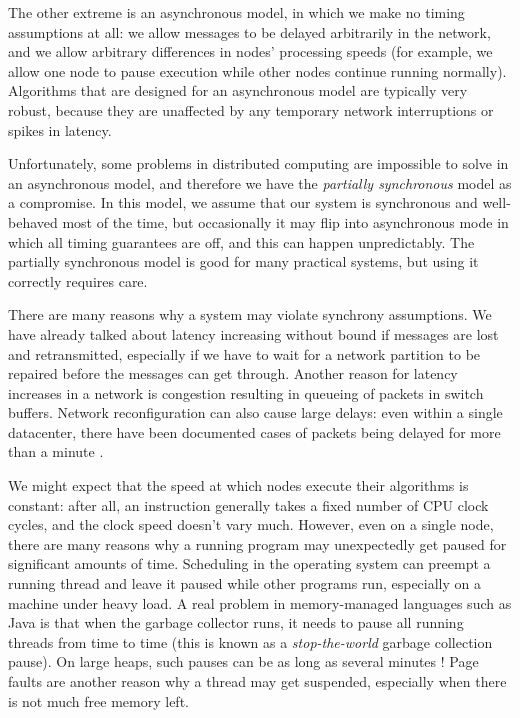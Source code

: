 The other extreme is an asynchronous model, in which we make no timing assumptions at all: we allow messages to be delayed arbitrarily in the network, and we allow arbitrary differences in nodes' processing speeds (for example, we allow one node to pause execution while other nodes continue running normally).
Algorithms that are designed for an asynchronous model are typically very robust, because they are unaffected by any temporary network interruptions or spikes in latency.

Unfortunately, some problems in distributed computing are impossible to solve in an asynchronous model, and therefore we have the \emph{partially synchronous} model as a compromise.
In this model, we assume that our system is synchronous and well-behaved most of the time, but occasionally it may flip into asynchronous mode in which all timing guarantees are off, and this can happen unpredictably.
The partially synchronous model is good for many practical systems, but using it correctly requires care.

There are many reasons why a system may violate synchrony assumptions.
We have already talked about latency increasing without bound if messages are lost and retransmitted, especially if we have to wait for a network partition to be repaired before the messages can get through.
Another reason for latency increases in a network is congestion resulting in queueing of packets in switch buffers.
Network reconfiguration can also cause large delays: even within a single datacenter, there have been documented cases of packets being delayed for more than a minute \citep{Imbriaco:2012tx}.

We might expect that the speed at which nodes execute their algorithms is constant: after all, an instruction generally takes a fixed number of CPU clock cycles, and the clock speed doesn't vary much.
However, even on a single node, there are many reasons why a running program may unexpectedly get paused for significant amounts of time.
Scheduling in the operating system can preempt a running thread and leave it paused while other programs run, especially on a machine under heavy load.
A real problem in memory-managed languages such as Java is that when the garbage collector runs, it needs to pause all running threads from time to time (this is known as a \emph{stop-the-world} garbage collection pause).
On large heaps, such pauses can be as long as several minutes \citep{Thompson:2013}!
Page faults are another reason why a thread may get suspended, especially when there is not much free memory left.

